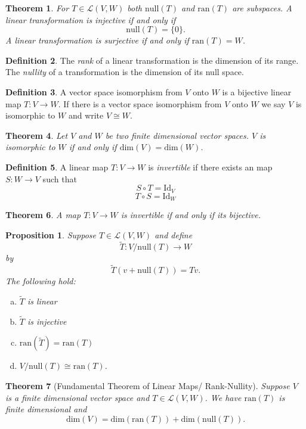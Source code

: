 \documentclass[12pt,letterpaper]{amsart}
\theoremstyle{plain}
\newtheorem{theorem}{Theorem}[section]
\newtheorem{proposition}{Proposition}[section]
\theoremstyle{definition}
\newtheorem{definition}[theorem]{Definition}
\numberwithin{equation}{section}
\begin{document}
\begin{theorem} For $T\in \mathcal{L}(V,W)$ both $\text{null}(T)$ and $\text{ran}(T)$ are subspaces. A linear transformation is injective if and only if 
\[\text{null}(T)=\{0\}.\]
A linear transformation is surjective if and only if $\text{ran}(T)=W$. 
\end{theorem}
\begin{definition} The \emph{rank} of a linear transformation is the dimension of its range. The \emph{nullity} of a transformation is the dimension of its null space. 
\end{definition}

\begin{definition} A vector space isomorphism from $V$ onto $W$ is a bijective linear map $T:V\rightarrow W$. If there is a vector space isomorphism from $V$ onto $W$ we say $V$ is isomorphic to $W$ and write $V\cong W$. 
\end{definition}
\begin{theorem} Let $V$ and $W$ be two finite dimensional vector spaces. $V$ is isomorphic to $W$ if and only if $\text{dim}(V)=\text{dim}(W)$.
\end{theorem}
\begin{definition} A linear map $T:V\rightarrow W$ is \emph{invertible} if there exists an map $S:W\rightarrow V$ such that 
\[S\circ T=\text{Id}_{V}\]
\[T\circ S=\text{Id}_{W}\]
\end{definition}
\begin{theorem} A map $T:V\rightarrow W$ is invertible if and only if its bijective. 
\end{theorem}

\begin{proposition} Suppose $T\in \mathcal{L}(V,W)$ and define 
\[\tilde{T}:V/\text{null}(T)\rightarrow W\] 
by
\[\tilde{T}(v+\text{null}(T))=Tv.\]
The following hold:
\begin{enumerate}[a)]
\item $\tilde{T}$ is linear
\item $\tilde{T}$ is injective
\item $\text{ran}(\tilde{T})=\text{ran}(T)$
\item $V/\text{null}(T)\cong \text{ran}(T)$.
\end{enumerate}

\end{proposition}
\begin{theorem}[Fundamental Theorem of Linear Maps/ Rank-Nullity]
Suppose $V$ is a finite dimensional vector space and $T\in \mathcal{L}(V,W)$. We have $\text{ran}(T)$ is finite dimensional and 
\[\text{dim}(V)=\text{dim}(\text{ran}(T))+\text{dim}(\text{null}(T)).\]
\end{theorem}
\end{document}
